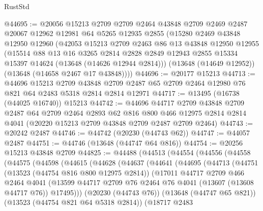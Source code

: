 \begin{lexlean}{RustStd}
\begin{coremodule}
@44695 := @20056
    @15213
    @2709
    @2709
    @2464
    @43848
    @2709
    @2469
    @2487
    @20067
    @12962
    @12981
    @64
    @5265
    @12935
    @2855
    (@15280
      @2469
      @43848
      @12950
      @12960
      (@42053
        @15213
        @2709
        @2463
        @86
        @13
        @43848
        @12950
        @12955
        (@15514
          @88
          @13
          @16
          @3265
          @2814
          @2828
          @2849
          @12943
          @2855
          @15334
          @15397
          @14624
          (@13648 (@14626 @12944 @2814)))
        (@13648 (@14649 @12952))
        (@13648 (@14658 @2467 @17 @43848))))
@44696 := @20177 @15213
@44713 := @44696
    @15213
    @2709
    @43848
    @2709
    @2487
    @65
    @2709
    @2464
    @12980
    @76
    @821
    @64
    @2483
    @5318
    @2814
    @2814
    @12971
@44717 := @13495 (@16738 (@44025 @16740)) @15213
@44742 := @44696
    @44717
    @2709
    @43848
    @2709
    @2487
    @64
    @2709
    @2464
    @2893
    @62
    @816
    @800
    @466
    @12975
    @2814
    @2814
    @4041
    (@20220 @15213 @2709 @43848 @2709 @2487 @2709 @2464)
@44743 := @20242 @2487
@44746 := @44742 (@20230 (@44743 @62))
@44747 := @44057 @2487
@44751 := @44746 (@13648 (@44747 @64 @816))
@44754 := @20256 @15213 @43848 @2709
@44825 := @44488
    (@44513
      (@44554
        (@44556
          (@44558
            (@44575
              (@44598
                (@44615
                  (@44628
                    (@44637
                      (@44641
                        (@44695
                          (@44713
                            (@44751
                              (@13523 (@44754 @816 @800 @12975 @2814))
                              (@17011
                                @44717
                                @2709
                                @466
                                @2464
                                @4041
                                (@13599
                                  @44717
                                  @2709
                                  @76
                                  @2464
                                  @76
                                  @4041
                                  (@13607 (@13608 @44717 @76))
                                  @17495)))
                            (@20230 (@44743 @76))
                            (@13648 (@44747 @65 @821))
                            (@13523 (@44754 @821 @64 @5318 @2814))
                            (@18717
                              @2483

\end{coremodule}
\end{lexlean}
